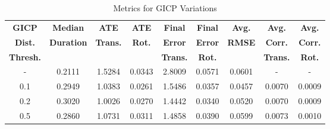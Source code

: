 \begin{table}[h]
    \centering
    \begin{tabular}{ccccccccc}
        \hline
        \textbf{GICP}    & \textbf{Median}   & \textbf{ATE}    & \textbf{ATE}  & \textbf{Final } & \textbf{Final} & \textbf{Avg.} & \textbf{Avg.}   & \textbf{Avg.}  \\
        \textbf{Dist.}   & \textbf{Duration} & \textbf{Trans.} & \textbf{Rot.} & \textbf{Error}  & \textbf{Error} & \textbf{RMSE} & \textbf{Corr.}  & \textbf{Corr.} \\
        \textbf{Thresh.} &                   & \textbf{}       & \textbf{}     & \textbf{Trans.} & \textbf{Rot.}  & \textbf{}     & \textbf{Trans.} & \textbf{Rot.}  \\
        \hline \hline
        -                & 0.2111            & 1.5284          & 0.0343        & 2.8009          & 0.0571         & 0.0601        & -               & -              \\
        0.1              & 0.2949            & 1.0383          & 0.0261        & 1.5486          & 0.0357         & 0.0457        & 0.0070          & 0.0009         \\
        0.2              & 0.3020            & 1.0026          & 0.0270        & 1.4442          & 0.0340         & 0.0520        & 0.0070          & 0.0009         \\
        0.5              & 0.2860            & 1.0731          & 0.0311        & 1.4858          & 0.0390         & 0.0599        & 0.0073          & 0.0010         \\
        \hline
    \end{tabular}
    \caption{Metrics for GICP Variations}
    \label{tab:gicp_variations}
\end{table}

\begin{figure}[h]
    \centering
    \hspace{1pt}
    \caption[]{
    }
    \label{fig:gicp-traj-result}
\end{figure}

